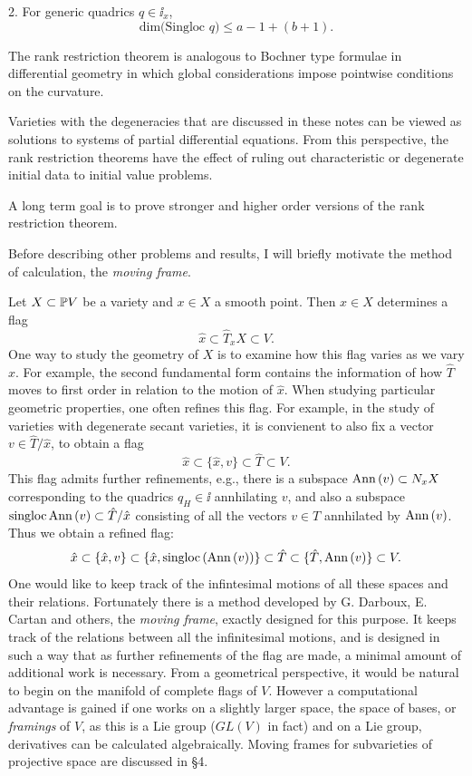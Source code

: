 2. For generic quadrics $q\in\ii_x$,
$$
\text{dim(Singloc }q)\leq a-1+(b+1).
$$
\endproclaim

The rank restriction theorem is analogous to
Bochner type formulae in differential geometry  
in which global considerations
impose pointwise  conditions on the curvature.

Varieties with the degeneracies that are discussed in these notes 
can be viewed  as solutions to systems of partial differential equations.
   From this perspective,
 the rank restriction
theorems have the effect of ruling out characteristic or
degenerate initial 
data to initial value problems.

A long term goal is to prove stronger and higher order
versions of the rank restriction theorem.  

\smallpagebreak

Before describing other problems and results, I will briefly 
motivate the method of calculation, the {\it moving frame}.

\smallpagebreak




Let $X\subset\Bbb P V$ be a variety and $x\in X$ a smooth point.
Then $x\in X$ determines a flag
$$
\hat x\subset\hat T_xX\subset V.
$$
One way to study the geometry of $X$ is to examine how this
flag varies as we vary $x$. For example, the second fundamental form
contains the information of how $\hat T$ moves to first order in
relation to the motion of $\hat x$.
When studying particular geometric properties, one often
refines this flag. For example, in the study of varieties
with degenerate secant varieties, it is convienent to
also fix a vector $v\in \hat T/\hat x$, to obtain a flag
$$
\hat x\subset\{\hat x,v\}\subset\hat T\subset V.
$$
This flag admits further refinements, e.g., there is
a subspace $\text{Ann}\, (v)\subset N_xX$ corresponding to the quadrics
  $q_H\in \ii$ annhilating $v$, and
also  a subspace $\text{singloc}\,\text{Ann}\, (v) \subset
\hat T/\hat x$  consisting of all the vectors
$v\in T$ annhilated by $\text{Ann}\, (v)$. Thus we obtain a refined flag:
 $$
\hat x\subset\{\hat x,v\}\subset \{\hat x,\text{singloc}\, (\text{Ann}\, (v) ) \}
\subset\hat T\subset \{\hat T , \text{Ann}\, (v)\} \subset V .
$$
One would like to keep track of the infintesimal motions
of all these spaces and their relations. Fortunately there
is a method developed by  G. Darboux, E. Cartan and others, the {\it moving
frame}, exactly designed for this purpose. It keeps track of
the relations between all the infinitesimal motions, and
is designed in such a way that as further refinements of the
flag are made, a minimal amount of additional work is necessary.
 From a geometrical perspective, it would be
natural to begin  on the manifold of complete flags of
$V$. However a computational advantage is gained if one works on
a slightly larger space, the space of bases, or {\it framings}
of $V$, as this is a Lie group ($GL(V)$ in fact) and on a
Lie group, derivatives
can be calculated algebraically.   Moving frames for subvarieties
of projective space are discussed in \S 4.

